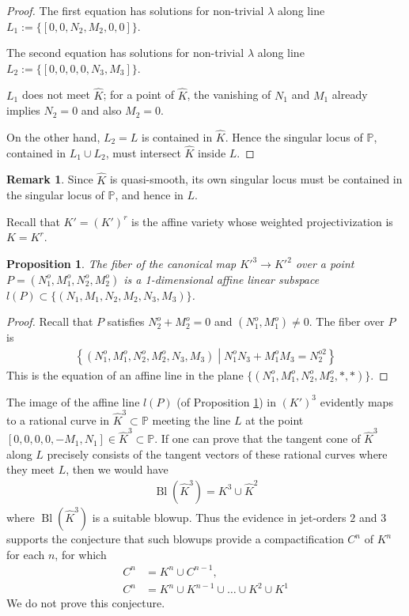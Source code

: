 \documentclass[12pt]{article}
\numberwithin{equation}{section}
\theoremstyle{plain}
\newtheorem{proposition}[definition]{Proposition}
\theoremstyle{definition}
\newtheorem{remark}[definition]{Remark}
\renewcommand{\P}{\mathbb{P}}
\newcommand{\ra}{\rightarrow}
\begin{document}
\begin{proof}
The first equation has solutions for non-trivial $\lambda$ along line $L_1:=\{[0,0,N_2,M_2,0,0]\}$.

The second equation has solutions for non-trivial $\lambda$ along line $L_2:=\{[0,0,0,0,N_3,M_3]\}$.

$L_1$ does not meet $\widehat{K}$; for a point of $\widehat{K}$, the vanishing of $N_1$ and $M_1$ already implies $N_2=0$ and also $M_2=0$.

On the other hand, $L_2=L$ is contained in $\widehat{K}$. Hence the singular locus of $\P$, contained in $L_1\cup L_2$, must intersect $\widehat{K}$ inside $L$.
\end{proof}
\begin{remark} Since $\widehat{K}$ is quasi-smooth, its own singular locus must be contained in the singular locus of $\P$, and hence in $L$.
\end{remark}

Recall that $K'=(K')^{r}$ is the affine variety whose weighted projectivization is $K=K^{r}$.

\begin{proposition}\label{fibs} The fiber of the canonical map $K'^{3}\ra K'^{2}$ over a point $P=(N^{o}_1,M^{o}_1,N^{o}_2,M^{o}_2)$ is a 1-dimensional affine linear subspace $l(P)\subset \{(N_1,M_1,N_2,M_2,N_3,M_3)\}$.
\end{proposition}
\begin{proof} Recall that $P$ satisfies $N^{o}_2+M^{o}_2=0$ and $(N^{o}_1,M^{o}_1)\neq 0$. The fiber over $P$ is
\begin{align*}
\left\{(N^{o}_1,M^{o}_1,N^{o}_2,M^{o}_2,N_3,M_3)  \mathrel{}\middle|\mathrel{}  N^{o}_1N_3+M^{o}_1M_3=N^{o2}_2 \right\}
\end{align*}
This is the equation of an affine line in the plane $\{(N^{o}_1,M^{o}_1,N^{o}_2,M^{o}_2,*,*)\}$.
\end{proof}

The image of the affine line $l(P)$ (of Proposition \ref{fibs}) in $(K')^{3}$ evidently maps to a rational curve in $\widehat{K}^{3}\subset \P$ meeting the line $L$ at the point $[0,0,0,0,-M_1,N_1]\in \widehat{K}^{3}\subset \P$. If one can prove that the tangent cone of $\widehat{K}^{3}$ along $L$ precisely consists of the tangent vectors of these rational curves where they meet $L$, then we would have
\begin{align*}
\operatorname{Bl}(\widehat{K}^{3})=K^{3}\cup \widehat{K}^{2}
\end{align*}
where $\operatorname{Bl}(\widehat{K}^{3})$ is a suitable blowup. Thus the evidence in jet-orders $2$ and $3$ supports the conjecture that such blowups provide a compactification $C^{n}$ of $K^{n}$ for each $n$, for which
\begin{align*}
C^{n}&=K^{n}\cup C^{n-1},\\ 
C^{n}&=K^{n}\cup K^{n-1}\cup \dots \cup K^{2}\cup K^{1}
\end{align*}
We do not prove this conjecture.
\end{document}
